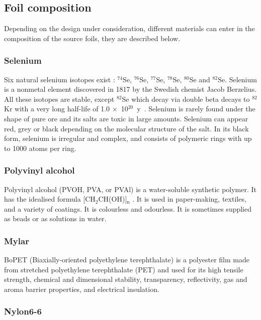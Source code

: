 \documentclass[main.tex]{subfiles}
\begin{document}
\subsection{Foil composition}\label{sec:FoilComposition}


\NI Depending on the design under consideration, different materials can enter in the composition of the source foils, they are described below.


\subsubsection{Selenium}


\NI Six natural selenium isotopes exist : $^{\text{74}}$Se, $^{\text{76}}$Se, $^{\text{77}}$Se, $^{\text{78}}$Se, $^{\text{80}}$Se and $^{\text{82}}$Se. Selenium is a nonmetal element discovered in 1817 by the Swedish chemist Jacob Berzelius. All these isotopes are stable, except $^{\text{82}}$Se which decay via double beta decays to $^{\text{82}}$Kr with a very long half-life of 1.0 $\times$~10$^{\text{20}}$~y~\cite{NEMO3:Se82}. Selenium is rarely found under the shape of pure ore and its salts are toxic in large amounts. Selenium can appear red, grey or black depending on the molecular structure of the salt. In its black form, selenium is irregular and complex, and consists of polymeric rings with up to 1000 atoms per ring. 


\subsubsection{Polyvinyl alcohol}


\NI Polyvinyl alcohol (PVOH, PVA, or PVAl) is a water-soluble synthetic polymer. It has the idealised formula [CH$_\text{2}$CH(OH)]$_\text{n}$ . It is used in paper-making, textiles, and a variety of coatings. It is colourless and odourless. It is sometimes supplied as beads or as solutions in water.


\subsubsection{Mylar}


\NI BoPET (Biaxially-oriented polyethylene terephthalate) is a polyester film made from stretched polyethylene terephthalate (PET) and used for its high tensile strength, chemical and dimensional stability, transparency, reflectivity, gas and aroma barrier properties, and electrical insulation.


\subsubsection{Nylon6-6}
\end{document}
